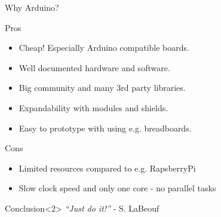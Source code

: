 \begin{frame}{Why Arduino?}
	\begin{block}{Pros}
		\begin{itemize}
			\item Cheap! Especially \textcolor{ReneOrange}{Arduino compatible} boards.
			\item Well documented hardware and software.
			\item Big community and many \textcolor{ReneOrange}{3rd party libraries}.
			\item Expandability with \textcolor{ReneOrange}{modules} and shields.
			\item Easy to \textcolor{ReneOrange}{prototype} with using e.g. breadboards.
		\end{itemize}		
	\end{block}	
	\begin{block}{Cons}
		\begin{itemize}
			\item Limited resources compared to e.g. RapsberryPi
			\item Slow clock speed and only one core - \textcolor{ReneOrange}{no parallel tasks}
		\end{itemize}	
	\end{block}
	\begin{exampleblock}{Conclusion}<2>
		\emph{``Just do it!''} - S. LaBeouf
	\end{exampleblock}		
\end{frame}